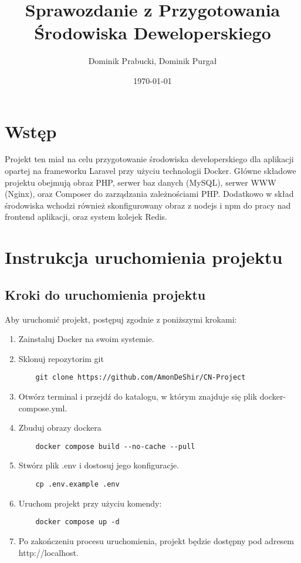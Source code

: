 \documentclass{article}
\title{Sprawozdanie z Przygotowania Środowiska Deweloperskiego}
\author{Dominik Prabucki, Dominik Purgał}
\date{\today}
\begin{document}
\maketitle

\section{Wstęp}
Projekt ten miał na celu przygotowanie środowiska developerskiego dla aplikacji opartej na frameworku Laravel przy użyciu technologii Docker. Główne składowe projektu obejmują obraz PHP, serwer baz danych (MySQL), serwer WWW (Nginx), oraz Composer do zarządzania zależnościami PHP. Dodatkowo w skład środowiska wchodzi również skonfigurowany obraz z nodejs i npm do pracy nad frontend aplikacji, oraz system kolejek Redis.

\section{Instrukcja uruchomienia projektu}
\subsection{Kroki do uruchomienia projektu}
Aby uruchomić projekt, postępuj zgodnie z poniższymi krokami:
\begin{enumerate}
    \item Zainstaluj Docker na swoim systemie.
    \item Sklonuj repozytorim git
    \begin{verbatim}
    git clone https://github.com/AmonDeShir/CN-Project
    \end{verbatim}
    \item Otwórz terminal i przejdź do katalogu, w którym znajduje się plik docker-compose.yml.
    \item Zbuduj obrazy dockera
    \begin{verbatim}
    docker compose build --no-cache --pull   
    \end{verbatim}
    \item Stwórz plik .env i dostosuj jego konfiguracje.
    \begin{verbatim}
    cp .env.example .env
    \end{verbatim}
    \item Uruchom projekt przy użyciu komendy:
    \begin{verbatim}
    docker compose up -d
    \end{verbatim}
    \item Po zakończeniu procesu uruchomienia, projekt będzie dostępny pod adresem http://localhost.
\end{enumerate}
\end{document}
